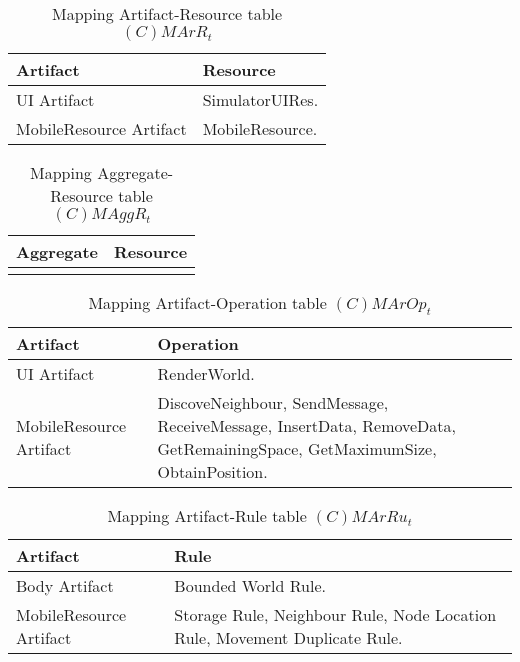 \begin{table}[H]
	\centering
	\begin{tabular}{|p{4cm}|p{8cm}|}
			\hline
			\textbf{Artifact} & \textbf{Resource} \\
			\hline
			UI Artifact & SimulatorUIRes. \\
			\hline
			MobileResource Artifact & MobileResource. \\
			\hline
		\end{tabular}
	\caption{Mapping Artifact-Resource table $(C)MArR_t$}
	\label{tab:cmarrt}
\end{table}

\begin{table}[H]
	\centering
	\begin{tabular}{|p{4cm}|p{8cm}|}
			\hline
			\textbf{Aggregate} & \textbf{Resource} \\
			\hline
			& \\
			\hline
		\end{tabular}
	\caption{Mapping Aggregate-Resource table $(C)MAggR_t$}
	\label{tab:cmaggrt}
\end{table}

\begin{table}[H]
	\centering
	\begin{tabular}{|p{4cm}|p{8cm}|}
			\hline
			\textbf{Artifact} & \textbf{Operation} \\
			\hline
			UI Artifact & RenderWorld. \\
			\hline
      MobileResource Artifact & DiscoveNeighbour, SendMessage, ReceiveMessage,
      InsertData, RemoveData, GetRemainingSpace, GetMaximumSize,
      ObtainPosition. \\
			\hline
		\end{tabular}
	\caption{Mapping Artifact-Operation table $(C)MArOp_t$}
	\label{tab:cmaropt}
\end{table}

\begin{table}[H]
	\centering
	\begin{tabular}{|p{4cm}|p{8cm}|}
			\hline
			\textbf{Artifact} & \textbf{Rule} \\
			\hline
			Body Artifact & Bounded World Rule. \\
			\hline
			MobileResource Artifact & Storage Rule, Neighbour Rule, Node Location
			Rule, Movement Duplicate Rule. \\
			\hline
		\end{tabular}
	\caption{Mapping Artifact-Rule table $(C)MArRu_t$}
	\label{tab:cmarrut}
\end{table}

